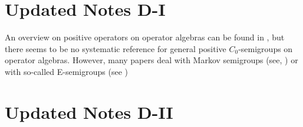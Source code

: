 \section*{Updated Notes D-I}
An overview on positive operators on operator algebras can be found in , but there seems to be no systematic reference for general positive 
$C_{0}$-semigroups on operator algebras.
However, many papers deal with Markov semigroups (see, \eg {}) or with so-called E-semigroups
(see )
\section*{Updated Notes D-II}
